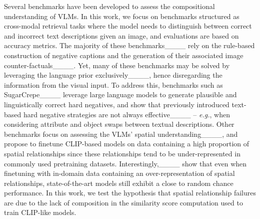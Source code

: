 Several benchmarks have been developed to assess the compositional understanding of VLMs. In this work, we focus on benchmarks structured as cross-modal retrieval tasks where the model needs to distinguish between correct and incorrect text descriptions given an image, and evaluations are based on accuracy metrics. The majority of these benchmarks____ rely on the rule-based construction of negative captions and the generation of their associated image counter-factuals____. Yet, many of these benchmarks may be solved by leveraging the language prior exclusively____, hence disregarding the information from the visual input. To address this, benchmarks such as SugarCrepe____ leverage large language models to generate plausible and linguistically correct hard negatives, and show that previously introduced text-based hard negative strategies are not always effective____ -- \textit{e.g.}, when considering attribute and object swaps between textual descriptions.
Other benchmarks focus on assessing the VLMs' spatial understanding____, and propose to finetune CLIP-based models on data containing a high proportion of spatial relationships since these relationships tend to be under-represented in commonly used pretraining datasets. Interestingly,____ show that even when finetuning with in-domain data containing an over-representation of spatial relationships, state-of-the-art models still exhibit a close to random chance performance. In this work, we test the hypothesis that spatial relationship failures are due to the lack of composition in the similarity score computation used to train CLIP-like models.


\iffalse
\myparagraph{PUG environment?}

\todo{Difficulty of evaluate the sample-efficiency of the effect hard negatives at scale so we first validate it in a controlled environment where we have access to the entire vocab + existing hard negatives }


Because of the difficulty of getting negative ground truth images, researchers often use synthetic data such like CLEVR____ to generate a balanced set of negative images and captions. In this work, we decided to leverage the PUG framework____ to make a synthetic image dataset with realistic 
\fi


